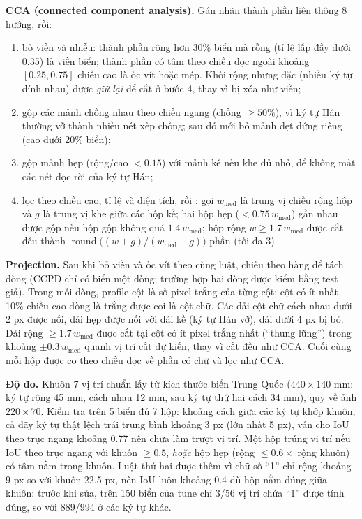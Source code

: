 \textbf{CCA (connected component analysis).} Gán nhãn thành phần liên thông 8 hướng, rồi:
{\sloppy
\begin{enumerate}
  \item bỏ viền và nhiễu: thành phần rộng hơn 30\% biển mà rỗng (tỉ lệ lấp đầy dưới 0.35) là viền biển; thành phần có tâm theo chiều dọc ngoài khoảng $[0.25,0.75]$ chiều cao là ốc vít hoặc mép. Khối rộng nhưng đặc (nhiều ký tự dính nhau) được \emph{giữ lại} để cắt ở bước 4, thay vì bị xóa như viền;
  \item gộp các mảnh chồng nhau theo chiều ngang (chồng $\ge 50\%$), vì ký tự Hán thường vỡ thành nhiều nét xếp chồng; sau đó mới bỏ mảnh dẹt đứng riêng (cao dưới 20\% biển);
  \item gộp mảnh hẹp (rộng/cao $<0.15$) với mảnh kề nếu khe đủ nhỏ, để không mất các nét dọc rời của ký tự Hán;
  \item lọc theo chiều cao, tỉ lệ và diện tích, rồi : gọi $w_{\mathrm{med}}$ là trung vị chiều rộng hộp và $g$ là trung vị khe giữa các hộp kề; hai hộp hẹp ($<0.75\,w_{\mathrm{med}}$) gần nhau được gộp nếu hộp gộp không quá $1.4\,w_{\mathrm{med}}$; hộp rộng $w\ge 1.7\,w_{\mathrm{med}}$ được cắt đều thành $\operatorname{round}\big((w+g)/(w_{\mathrm{med}}+g)\big)$ phần (tối đa 3).
\end{enumerate}
\par}

\textbf{Projection.} Sau khi bỏ viền và ốc vít theo cùng luật,  chiếu theo hàng để tách dòng (CCPD chỉ có biển một dòng; trường hợp hai dòng được kiểm bằng test giả). Trong mỗi dòng, profile cột là số pixel trắng của từng cột; cột có ít nhất 10\% chiều cao dòng là trắng được coi là cột chữ. Các dải cột chữ cách nhau dưới 2 px được nối, dải hẹp được nối với dải kề (ký tự Hán vỡ), dải dưới 4 px bị bỏ. Dải rộng $\ge 1.7\,w_{\mathrm{med}}$ được cắt tại cột có ít pixel trắng nhất (``thung lũng'') trong khoảng $\pm 0.3\,w_{\mathrm{med}}$ quanh vị trí cắt dự kiến, thay vì cắt đều như CCA. Cuối cùng mỗi hộp được co theo chiều dọc về phần có chữ và lọc như CCA.

\textbf{Độ đo.} Khuôn 7 vị trí chuẩn lấy từ kích thước biển Trung Quốc ($440\times 140$ mm: ký tự rộng 45 mm, cách nhau 12 mm, sau ký tự thứ hai cách 34 mm), quy về ảnh $220\times 70$. Kiểm tra trên 5 biển  đủ 7 hộp: khoảng cách giữa các ký tự khớp khuôn, cả dãy ký tự thật lệch trái trung bình khoảng 3 px (lớn nhất 5 px), vẫn cho IoU theo trục ngang khoảng 0.77 nên chưa làm trượt vị trí. Một hộp trúng vị trí nếu IoU theo trục ngang với khuôn $\ge 0.5$, \emph{hoặc} hộp hẹp (rộng $\le 0.6\times$ rộng khuôn) có tâm nằm trong khuôn. Luật thứ hai được thêm vì chữ số ``1'' chỉ rộng khoảng 9 px so với khuôn 22.5 px, nên IoU luôn khoảng 0.4 dù hộp nằm đúng giữa khuôn: trước khi sửa, trên 150 biển  của tune chỉ 3/56 vị trí chứa ``1'' được tính đúng, so với 889/994 ở các ký tự khác.

